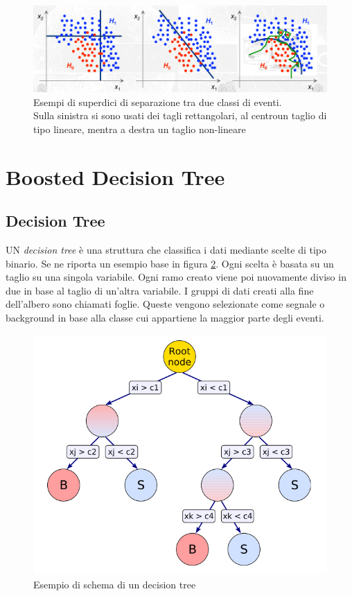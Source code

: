     \begin{figure}[htbp]
        \centering
        \includegraphics[width=0.8\linewidth]{TMVA/problemiSelezione.png}
        \caption{ Esempi di superdici di separazione tra due classi di eventi.
        \\ Sulla sinistra si sono usati dei tagli rettangolari, al centroun taglio di tipo lineare, mentra a destra un taglio non-lineare }
        \label{fig:esempiCut}
    \end{figure}
    
\section{Boosted Decision Tree}

    \subsection{Decision Tree}
    UN \textit{decision tree} è una struttura che classifica i dati mediante scelte di tipo binario. Se ne riporta un esempio base in figura \ref{fig:BDT}. Ogni scelta è basata su un taglio su una singola variabile. Ogni ramo creato viene poi nuovamente diviso in due in base al taglio di un'altra variabile. I gruppi di dati creati alla fine dell'albero sono chiamati foglie. Queste vengono selezionate come segnale o background in base alla classe cui appartiene la maggior parte degli eventi. 
    
    \begin{figure}[htbp]
        \centering
        \includegraphics[width=0.5\linewidth]{TMVA/BDT1.PNG}
        \caption{ Esempio di schema di un decision tree}
        \label{fig:BDT}
    \end{figure}
    
